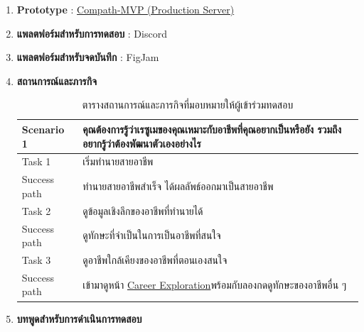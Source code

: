 \begin{enumerate}
    \item \textbf{Prototype} : \href{https://compath-cpe.web.app/}{Compath-MVP (Production Server)}
    \item \textbf{แพลตฟอร์มสำหรับการทดสอบ} : Discord
    \item \textbf{แพลตฟอร์มสำหรับจดบันทึก} : FigJam
    \item \textbf{สถานการณ์และภารกิจ}
          \begin{table}[H]
              \caption{ตารางสถานการณ์และภารกิจที่มอบหมายให้ผู้เข้าร่วมทดสอบ}
              \label{tab:scenarioUT}
              \begin{tabularx}{\textwidth}{|l|X|}
                  \hline
                  \textbf{Scenario 1} & \textbf{คุณต้องการรู้ว่าเรซูเมของคุณเหมาะกับอาชีพที่คุณอยากเป็นหรือยัง รวมถึงอยากรู้ว่าต้องพัฒนาตัวเองอย่างไร} \\ \hline
                  Task 1              & เริ่มทำนายสายอาชีพ                                                                          \\ \hline
                  Success path        & ทำนายสายอาชีพสำเร็จ ได้ผลลัพธ์ออกมาเป็นสายอาชีพ                                                  \\ \hline
                  Task 2              & ดูข้อมูลเชิงลึกของอาชีพที่ทำนายได้                                                                \\ \hline
                  Success path        & ดูทักษะที่จำเป็นในการเป็นอาชีพที่สนใจ                                                             \\ \hline
                  Task 3              & ดูอาชีพใกล้เคียงของอาชีพที่ตอนเองสนใจ                                                          \\ \hline
                  Success path        & เข้ามาดูหน้า \hyperref[subsec:Career Exploration]{Career Exploration}พร้อมกับลองกดดูทักษะของอาชีพอื่น ๆ                                           \\ \hline
              \end{tabularx}
          \end{table}
    \item \textbf{บทพูดสำหรับการดำเนินการทดสอบ}
          \begin{figure}[H]\centering

\end{figure}
\end{enumerate}
